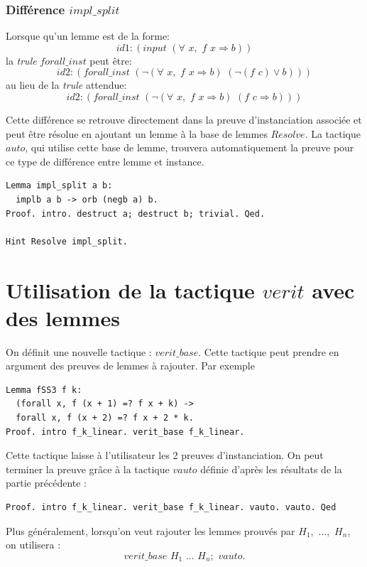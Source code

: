 \documentclass[11pt]{article}
\begin{document}
\subsubsection{Différence $impl\_split$}

Lorsque qu'un lemme est de la forme:
\[ id1:(input \,\,(\forall\,\, x,\,\, f \,\,x \Rightarrow b)) \]
la \textit{trule} $forall\_inst$ peut être:
\[ id2:(forall\_inst \,\, ( \neg (\forall\,\, x, \,\,f \,\, x \Rightarrow b) \,\,(\neg (f\,\, c) \vee  b))) \]
au lieu de la \textit{trule} attendue:
\[ id2:(forall\_inst  \,\,( \neg (\forall \,\,x,\,\, f\,\, x \Rightarrow b)\,\, (f \,\,c \Rightarrow b))) \]

Cette différence se retrouve directement dans la preuve d'instanciation associée et peut être résolue en ajoutant un lemme à la base de lemmes $Resolve$. La tactique $auto$, qui utilise cette base de lemme, trouvera automatiquement la preuve pour ce type de différence entre lemme et instance.

\begin{lstlisting}[frame=single]
Lemma impl_split a b:
  implb a b -> orb (negb a) b.
Proof. intro. destruct a; destruct b; trivial. Qed.

Hint Resolve impl_split.
\end{lstlisting}



\section{Utilisation de la tactique $verit$ avec des lemmes}

On définit une nouvelle tactique : $verit\_base$. Cette tactique peut prendre en argument des preuves de lemmes à rajouter. Par exemple 
\begin{lstlisting}[frame=single]
Lemma fSS3 f k:
  (forall x, f (x + 1) =? f x + k) ->
  forall x, f (x + 2) =? f x + 2 * k.
Proof. intro f_k_linear. verit_base f_k_linear.
\end{lstlisting}
Cette tactique laisse à l'utilisateur les 2 preuves d'instanciation. On peut terminer la preuve grâce à la tactique $vauto$ définie d'après les résultats de la partie précédente : 
\begin{lstlisting}[frame=single]
Proof. intro f_k_linear. verit_base f_k_linear. vauto. vauto. Qed
\end{lstlisting}
Plus généralement, lorsqu'on veut rajouter les lemmes prouvés par $H_1, \,\,...,\,\, H_n$, on utilisera : \[verit\_base\,\, H_1 \,\,...\,\, H_n; \,\,vauto.\]
\end{document}

